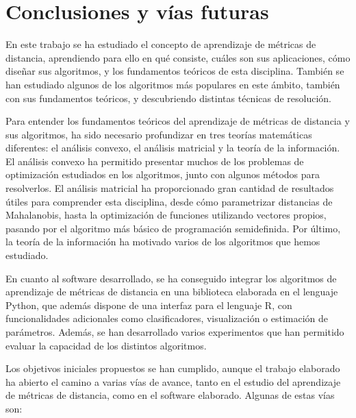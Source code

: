 \chapter{Conclusiones y vías futuras}

En este trabajo se ha estudiado el concepto de aprendizaje de métricas de distancia, aprendiendo para ello en qué consiste, cuáles son sus aplicaciones, cómo diseñar sus algoritmos, y los fundamentos teóricos de esta disciplina. También se han estudiado algunos de los algoritmos más populares en este ámbito, también con sus fundamentos teóricos, y descubriendo distintas técnicas de resolución.

Para entender los fundamentos teóricos del aprendizaje de métricas de distancia y sus algoritmos, ha sido necesario profundizar en tres teorías matemáticas diferentes: el análisis convexo, el análisis matricial y la teoría de la información. El análisis convexo ha permitido presentar muchos de los problemas de optimización estudiados en los algoritmos, junto con algunos métodos para resolverlos. El análisis matricial ha proporcionado gran cantidad de resultados útiles para comprender esta disciplina, desde cómo parametrizar distancias de Mahalanobis, hasta la optimización de funciones utilizando vectores propios, pasando por el algoritmo más básico de programación semidefinida. Por último, la teoría de la información ha motivado varios de los algoritmos que hemos estudiado.

En cuanto al software desarrollado, se ha conseguido integrar los algoritmos de aprendizaje de métricas de distancia en una biblioteca elaborada en el lenguaje Python, que además dispone de una interfaz para el lenguaje R, con funcionalidades adicionales como clasificadores, visualización o estimación de parámetros. Además, se han desarrollado varios experimentos que han permitido evaluar la capacidad de los distintos algoritmos.

Los objetivos iniciales propuestos se han cumplido, aunque el trabajo elaborado ha abierto el camino a varias vías de avance, tanto en el estudio del aprendizaje de métricas de distancia, como en el software elaborado. Algunas de estas vías son:

